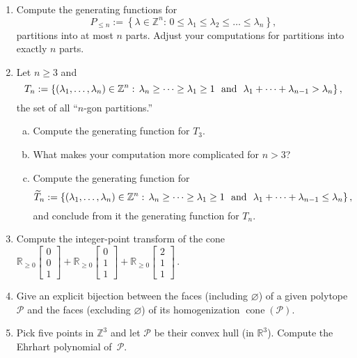 \documentclass[11pt]{article}
\def\cP{\mathcal{P}}
\def\RR{\mathbb{R}}
\def\ZZ{\mathbb{Z}}
\newcommand\cone{\operatorname{cone}}
\begin{document}
\begin{enumerate}[(1)]
\vspace{-10pt}

\item Compute the generating functions for
\[
  P_{ \le n } := \left\{ \lambda \in \ZZ^n : \, 0 \le \lambda_1 \le \lambda_2 \le
\dots \le \lambda_n \right\} ,
\]
partitions into at most $n$ parts.
Adjust your computations for partitions into exactly $n$ parts.

\def\la{\lambda}

\item Let $n \ge 3$ and
\[
  T_n := \left\{ (\la_1, \dots , \la_n) \in \ZZ^n : \, \la_n \ge \cdots \ge \la_1 \ge 1 \ \text{ \rm and } \ \la_1 + \cdots + \la_{n-1} > \la_n \right\} ,
\]
the set of all ``$n$-gon partitions.''
\begin{enumerate}[(a)]
\item Compute the generating function for $T_3$.
\item What makes your computation more complicated for $n > 3$?
\item Compute the generating function for
\[
  \widetilde T_n := \left\{ (\la_1, \dots , \la_n) \in \ZZ^n : \, \la_n \ge \cdots
\ge \la_1 \ge 1 \ \text{ \rm and } \ \la_1 + \cdots + \la_{n-1} \le \la_n \right\} ,
\]
and conclude from it the generating function for $T_n$.
\end{enumerate}

\item Compute the integer-point transform of the cone
$
  \RR_{ \ge 0 } \begin{bmatrix} 0 \\ 0 \\ 1 \end{bmatrix} + 
  \RR_{ \ge 0 } \begin{bmatrix} 0 \\ 1 \\ 1 \end{bmatrix} + 
  \RR_{ \ge 0 } \begin{bmatrix} 2 \\ 1 \\ 1 \end{bmatrix} \, .
$

\item Give an explicit bijection between the faces (including $\varnothing$) of a
given polytope $\cP$ and the faces (excluding $\varnothing$) of its homogenization
$\cone(\cP)$.

\item Pick five points in $\ZZ^3$ and let $\cP$ be their convex hull (in $\RR^3$). Compute the Ehrhart polynomial of~$\cP$.


\end{enumerate}
\end{document}
